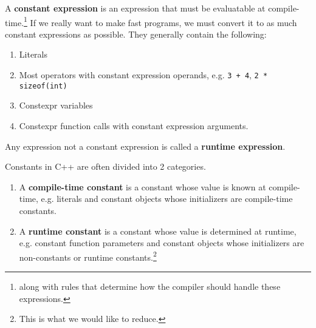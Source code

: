 \documentclass{article}
\begin{document}
    \begin{definition}
      A \textbf{constant expression} is an expression that must be evaluatable at compile-time.\footnote{along with rules that determine how the compiler should handle these expressions.} If we really want to make fast programs, we must convert it to as much constant expressions as possible. They generally contain the following: 
      \begin{enumerate}
        \item Literals 
        \item Most operators with constant expression operands, e.g. \texttt{3 + 4}, \texttt{2 * sizeof(int)} 
        \item Constexpr variables  
        \item Constexpr function calls with constant expression arguments. 
      \end{enumerate}
      Any expression not a constant expression is called a \textbf{runtime expression}. 
    \end{definition}

    Constants in C++ are often divided into 2 categories. 
    \begin{enumerate}
      \item A \textbf{compile-time constant} is a constant whose value is known at compile-time, e.g. literals and constant objects whose initializers are compile-time constants. 
      \item A \textbf{runtime constant} is a constant whose value is determined at runtime, e.g. constant function parameters and constant objects whose initializers are non-constants or runtime constants.\footnote{This is what we would like to reduce.} 
    \end{enumerate}
\end{document}
